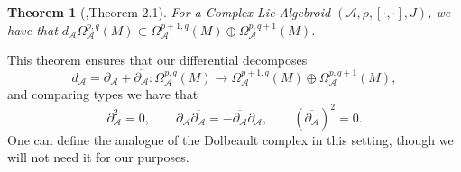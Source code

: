 \documentclass{amsart}
\newcommand{\p}{\partial}
\newcommand{\ra}{\rightarrow}
\newtheorem{theorem}{Theorem}
\theoremstyle{definition}
\newcommand{\A}{\mathcal{A}}
\theoremstyle{definition}
\begin{document}
\begin{theorem}[\cite{MR3483864},Theorem 2.1]
    For a Complex Lie Algebroid $(\A,\rho,[\cdot, \cdot],J)$, we have that
         $d_\A \Omega^{p,q}_\A(M) \subset \Omega^{p+1,q}_\A(M) \oplus \Omega ^{p,q+1}_\A(M)$.
\end{theorem}
This theorem ensures that our differential decomposes 
\begin{equation*}
    d_\A = \p_\A + \overline{\p_\A}:\Omega^{p,q}_\A(M) \ra \Omega_\A^{p+1,q}(M) \oplus \Omega_\A^{p,q+1}(M),
\end{equation*}
and comparing types we have that
\begin{equation*}
    \p_\A^2 =0, \qquad \p_\A \overline{\p_\A} = -\overline{\p_\A} \p_\A ,\qquad (\overline{\p_\A}) ^2=0.
\end{equation*}
One can define the analogue of the Dolbeault complex in this setting, though we will not need it for our purposes.
\end{document}
